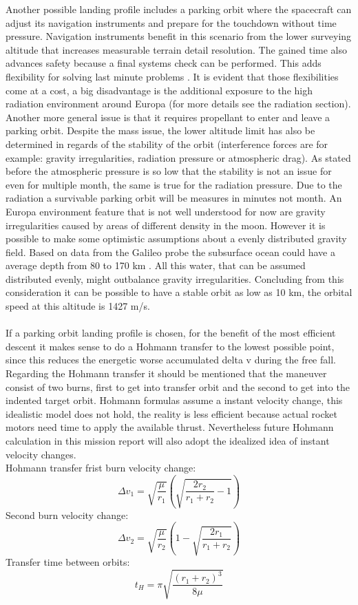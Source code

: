 Another possible landing profile includes a parking orbit where the spacecraft can adjust its navigation instruments and prepare for the touchdown without time pressure. Navigation instruments benefit in this scenario from the lower surveying altitude that increases measurable terrain detail resolution. The gained time also advances safety because a final systems check can be performed. This adds flexibility for solving last minute problems . It is evident that those flexibilities come at a cost, a big disadvantage is the additional exposure to the high radiation environment around Europa (for more details see the radiation section). Another more general issue is that it requires propellant to enter and leave a parking orbit. Despite the mass issue, the lower altitude limit has also be determined in regards of the stability of the orbit (interference forces are for example: gravity irregularities, radiation pressure or atmospheric drag). As stated before the atmospheric pressure is so low that the stability is not an issue for even for multiple month, the same is true for the radiation pressure. Due to the radiation a survivable parking orbit will be measures in minutes not month. An Europa environment feature that is not well understood for now are gravity irregularities caused by areas of different density in the moon. However it is possible to make some optimistic assumptions about a evenly distributed gravity field. Based on data from the Galileo probe the subsurface ocean could have a average depth from 80 to 170 km \cite{KevinHandWater}. All this water, that can be assumed distributed evenly, might outbalance gravity irregularities. Concluding from this consideration it can be possible to have a stable orbit as low as 10 km, the orbital speed at this altitude is 1427 m/s.\\
\\
If a parking orbit landing profile is chosen, for the benefit of the most efficient descent it makes sense to do a Hohmann transfer to the lowest possible point, since this reduces the energetic worse accumulated delta v during the free fall. Regarding the Hohmann transfer it should be mentioned that the maneuver consist of two burns, first to get into transfer orbit and the second to get into the indented target orbit. Hohmann formulas assume a instant velocity change, this idealistic model does not hold, the reality is less efficient because actual rocket motors need time to apply the available thrust. Nevertheless future Hohmann calculation in this mission report will also adopt the idealized idea of instant velocity changes.\\
Hohmann transfer frist burn velocity change:
$$ \Delta v_{1} = \sqrt{\frac{\mu}{r_{1}}}\left(\sqrt{\frac{2r_{2}}{r_{1}+r_{2}}-1}\right) $$
Second burn velocity change:
$$ \Delta v_{2} = \sqrt{\frac{\mu}{r_{2}}}\left(1-\sqrt{\frac{2r_{1}}{r_{1}+r_{2}}}\right) $$
Transfer time between orbits:
$$ t_{H}= \pi \sqrt{\frac{(r_{1}+r_{2})^3}{8\mu}} $$

